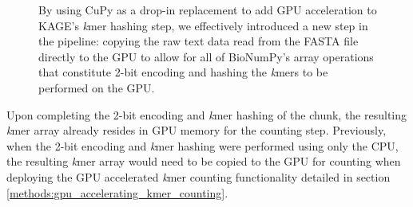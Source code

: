 \begin{figure}[H]
\begin{center}
\caption{
  By using CuPy as a drop-in replacement to add GPU acceleration to KAGE's \textit{k}mer hashing step, we effectively introduced a new step in the pipeline: copying the raw text data read from the FASTA file directly to the GPU to allow for all of BioNumPy's array operations that constitute 2-bit encoding and hashing the \textit{k}mers to be performed on the GPU.
}
\label{methods:gpu_accelerating_kmer_hashing:figures:gpu_pipeline}
\end{center}
\end{figure}

Upon completing the 2-bit encoding and \textit{k}mer hashing of the chunk, the resulting \textit{k}mer array already resides in GPU memory for the counting step.
Previously, when the 2-bit encoding and \textit{k}mer hashing were performed using only the CPU, the resulting \textit{k}mer array would need to be copied to the GPU for counting when deploying the GPU accelerated \textit{k}mer counting functionality detailed in section \ref{methods:gpu_accelerating_kmer_counting}.

